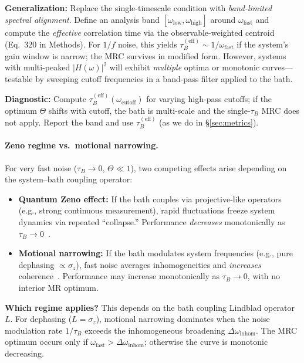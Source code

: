 \documentclass[11pt,letterpaper]{article}
\begin{document}
\textbf{Generalization:} Replace the single-timescale condition with \emph{band-limited spectral alignment}. Define an analysis band $[\omega_{\text{low}}, \omega_{\text{high}}]$ around $\omega_{\mathrm{fast}}$ and compute the \emph{effective} correlation time via the observable-weighted centroid (Eq.~320 in Methods). For $1/f$ noise, this yields $\tau_B^{(\text{eff})}\sim 1/\omega_{\mathrm{fast}}$ if the system's gain window is narrow; the MRC survives in modified form. However, systems with multi-peaked $|H(\omega)|^2$ will exhibit \emph{multiple} optima or monotonic curves—testable by sweeping cutoff frequencies in a band-pass filter applied to the bath.

\textbf{Diagnostic:} Compute $\tau_B^{(\text{eff})}(\omega_{\text{cutoff}})$ for varying high-pass cutoffs; if the optimum $\Theta$ shifts with cutoff, the bath is multi-scale and the single-$\tau_B$ MRC does not apply. Report the band and use $\tau_B^{(\text{eff})}$ (as we do in §\ref{sec:metrics}).

\paragraph{Zeno regime vs.\ motional narrowing.}
For very fast noise ($\tau_B \to 0$, $\Theta\ll 1$), two competing effects arise depending on the system--bath coupling operator:
\begin{itemize}[leftmargin=*,noitemsep,topsep=0pt]
\item \textbf{Quantum Zeno effect:} If the bath couples via projective-like operators (e.g., strong continuous measurement), rapid fluctuations freeze system dynamics via repeated ``collapse.'' Performance \emph{decreases} monotonically as $\tau_B\to 0$~\cite{Plenio1998}.
\item \textbf{Motional narrowing:} If the bath modulates system frequencies (e.g., pure dephasing $\propto\sigma_z$), fast noise averages inhomogeneities and \emph{increases} coherence~\cite{Schlosshauer2019}. Performance may increase monotonically as $\tau_B\to 0$, with no interior MR optimum.
\end{itemize}

\textbf{Which regime applies?} This depends on the bath coupling Lindblad operator $L$. For dephasing ($L=\sigma_z$), motional narrowing dominates when the noise modulation rate $1/\tau_B$ exceeds the inhomogeneous broadening $\Delta\omega_{\text{inhom}}$. The MRC optimum occurs only if $\omega_{\mathrm{fast}} > \Delta\omega_{\text{inhom}}$; otherwise the curve is monotonic decreasing.
\end{document}
